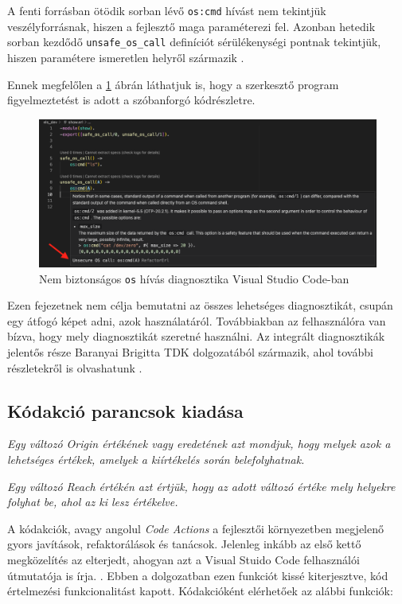 A fenti forrásban ötödik sorban lévő \lstinline{os:cmd} hívást nem tekintjük veszélyforrásnak, hiszen a fejlesztő maga paraméterezi fel. Azonban hetedik sorban kezdődő \lstinline{unsafe_os_call} definíciót sérülékenységi pontnak tekintjük, hiszen paramétere ismeretlen helyről származik \cite{refactorerlSecurity}.

Ennek megfelőlen a \ref{fig:unsafe_os_call_vscode} ábrán láthatjuk is, hogy a szerkesztő program figyelmeztetést is adott a szóbanforgó kódrészletre. 

\begin{figure}[H]
  \centering
  \includegraphics[width=\linewidth]{images/unsafe_os_with_safe_os.png}
  \caption{Nem biztonságos \lstinline{os} hívás diagnosztika Visual Studio Code-ban}
  \label{fig:unsafe_os_call_vscode}
\end{figure}

Ezen fejezetnek nem célja bemutatni az összes lehetséges diagnosztikát, csupán egy átfogó képet adni, azok használatáról. Továbbiakban az felhasználóra van bízva, hogy mely diagnosztikát szeretné használni. Az integrált diagnosztikák jelentős része Baranyai Brigitta TDK dolgozatából származik, ahol további részletekről is olvashatunk \cite{refactorerlSecurity}.


\subsection{Kódakció parancsok kiadása}

\textit{Egy változó Origin értékének vagy eredetének azt mondjuk, hogy melyek azok a lehetséges értékek, amelyek a kiírtékelés során belefolyhatnak.} \cite{macs10paper} \cite{cefp11paper} 

\textit{Egy változó Reach értékén azt értjük, hogy az adott változó értéke mely helyekre folyhat be, ahol az ki lesz értékelve.} \cite{macs10paper} \cite{cefp11paper} 

A kódakciók, avagy angolul \textit{Code Actions} a fejlesztői környezetben megjelenő gyors javítások, refaktorálások és tanácsok. Jelenleg inkább az első kettő megközelítés az elterjedt, ahogyan azt a Visual Stuido Code felhasználói útmutatója is írja. \cite{vscodeCodeActionUserGuide}. Ebben a dolgozatban ezen funkciót kissé kiterjesztve, kód értelmezési funkcionalitást kapott. Kódakcióként elérhetőek az alábbi funkciók:

